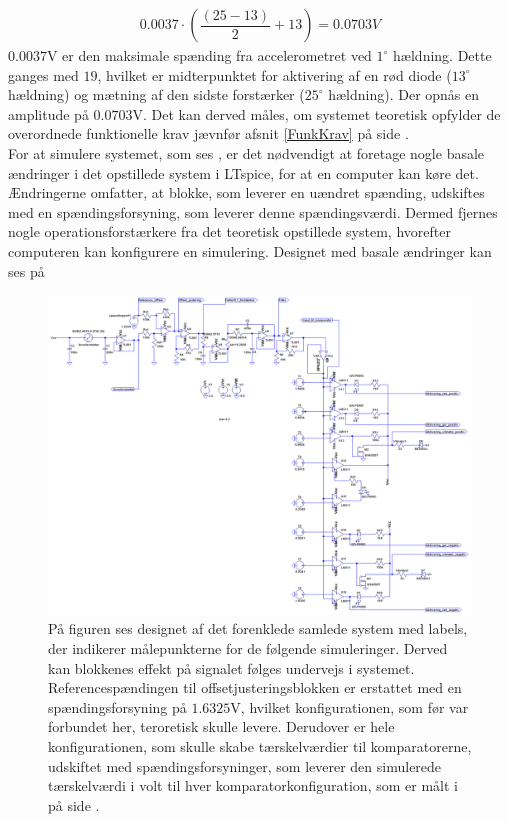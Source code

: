 \begin{eqnarray}
0.0037 \cdot (\dfrac{(25-13)}{2} + 13) = 0.0703V
\end{eqnarray}
\noindent $0.0037$V er den maksimale spænding fra accelerometret ved $1^{\circ}$ hældning. Dette ganges med $19$, hvilket er midterpunktet for aktivering af en rød diode ($13^{\circ}$ hældning) og mætning af den sidste forstærker ($25^{\circ}$ hældning). Der opnås en amplitude på $0.0703$V. Det kan derved måles, om systemet teoretisk opfylder de overordnede funktionelle krav jævnfør afsnit \ref{FunkKrav} på side \pageref{FunkKrav}.\\
For at simulere systemet, som ses , er det nødvendigt at foretage nogle basale ændringer i det opstillede system i LTspice, for at en computer kan køre det. Ændringerne omfatter, at blokke, som leverer en uændret spænding, udskiftes med en spændingsforsyning, som leverer denne spændingsværdi. Dermed fjernes nogle operationsforstærkere fra det teoretisk opstillede system, hvorefter computeren kan konfigurere en simulering. Designet med basale ændringer kan ses på 
\begin{figure}[H]
	\centering
	\includegraphics[scale=.38]{figures/cProblemloesning/Samlet_system2_sim.PNG}
	\caption{På figuren ses designet af det forenklede samlede system med labels, der indikerer målepunkterne for de følgende simuleringer. Derved kan blokkenes effekt på signalet følges undervejs i systemet. Referencespændingen til offsetjusteringsblokken er erstattet med en spændingsforsyning på $1.6325$V, hvilket konfigurationen, som før var forbundet her, teroretisk skulle levere. Derudover er hele konfigurationen, som skulle skabe tærskelværdier til komparatorerne, udskiftet med spændingsforsyninger, som leverer den simulerede tærskelværdi i volt til hver komparatorkonfiguration, som er målt i  på side \pageref{Tab:test_reference1}.}
	\label{fig:samlet_system}
\end{figure}
